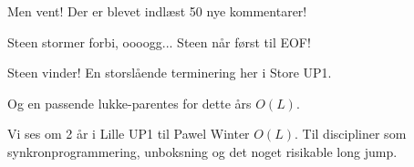 \documentclass[a4paper,11pt]{article}
\begin{document}
\begin{sketch}
    Men vent! Der er blevet indlæst 50 nye kommentarer!

    Steen stormer forbi, oooogg... Steen når først til EOF!

    Steen vinder! En storslående terminering her i Store UP1.

    Og en passende lukke-parentes for dette års $O(L)$.

    Vi ses om 2 år i Lille UP1 til Pawel Winter $O(L)$. Til discipliner
    som synkronprogrammering, unboksning og det noget risikable long jump.


\end{sketch}
\end{document}
